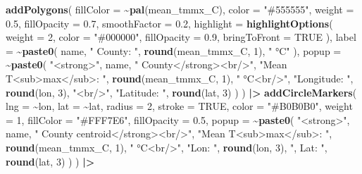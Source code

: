 \documentclass[
]{article}
\newenvironment{Shaded}{\begin{snugshade}}{\end{snugshade}}
\newcommand{\AttributeTok}[1]{\textcolor[rgb]{0.13,0.29,0.53}{#1}}
\newcommand{\ConstantTok}[1]{\textcolor[rgb]{0.56,0.35,0.01}{#1}}
\newcommand{\DecValTok}[1]{\textcolor[rgb]{0.00,0.00,0.81}{#1}}
\newcommand{\FloatTok}[1]{\textcolor[rgb]{0.00,0.00,0.81}{#1}}
\newcommand{\FunctionTok}[1]{\textcolor[rgb]{0.13,0.29,0.53}{\textbf{#1}}}
\newcommand{\NormalTok}[1]{#1}
\newcommand{\SpecialCharTok}[1]{\textcolor[rgb]{0.81,0.36,0.00}{\textbf{#1}}}
\newcommand{\StringTok}[1]{\textcolor[rgb]{0.31,0.60,0.02}{#1}}
\begin{document}
\begin{Shaded}
\begin{Highlighting}[]
  \FunctionTok{addPolygons}\NormalTok{(}
    \AttributeTok{fillColor   =} \SpecialCharTok{\textasciitilde{}}\FunctionTok{pal}\NormalTok{(mean\_tmmx\_C),}
    \AttributeTok{color       =} \StringTok{"\#555555"}\NormalTok{,}
    \AttributeTok{weight      =} \FloatTok{0.5}\NormalTok{,}
    \AttributeTok{fillOpacity =} \FloatTok{0.7}\NormalTok{,}
    \AttributeTok{smoothFactor =} \FloatTok{0.2}\NormalTok{,}
    \AttributeTok{highlight =} \FunctionTok{highlightOptions}\NormalTok{(}
      \AttributeTok{weight      =} \DecValTok{2}\NormalTok{,}
      \AttributeTok{color       =} \StringTok{"\#000000"}\NormalTok{,}
      \AttributeTok{fillOpacity =} \FloatTok{0.9}\NormalTok{,}
      \AttributeTok{bringToFront =} \ConstantTok{TRUE}
\NormalTok{    ),}
    \AttributeTok{label =} \SpecialCharTok{\textasciitilde{}}\FunctionTok{paste0}\NormalTok{(}
\NormalTok{      name, }\StringTok{" County: "}\NormalTok{,}
      \FunctionTok{round}\NormalTok{(mean\_tmmx\_C, }\DecValTok{1}\NormalTok{), }\StringTok{" °C"}
\NormalTok{    ),}
    \AttributeTok{popup =} \SpecialCharTok{\textasciitilde{}}\FunctionTok{paste0}\NormalTok{(}
      \StringTok{"\textless{}strong\textgreater{}"}\NormalTok{, name, }\StringTok{" County\textless{}/strong\textgreater{}\textless{}br/\textgreater{}"}\NormalTok{,}
      \StringTok{"Mean T\textless{}sub\textgreater{}max\textless{}/sub\textgreater{}: "}\NormalTok{, }\FunctionTok{round}\NormalTok{(mean\_tmmx\_C, }\DecValTok{1}\NormalTok{), }\StringTok{" °C\textless{}br/\textgreater{}"}\NormalTok{,}
      \StringTok{"Longitude: "}\NormalTok{, }\FunctionTok{round}\NormalTok{(lon, }\DecValTok{3}\NormalTok{), }\StringTok{"\textless{}br/\textgreater{}"}\NormalTok{,}
      \StringTok{"Latitude: "}\NormalTok{, }\FunctionTok{round}\NormalTok{(lat, }\DecValTok{3}\NormalTok{)}
\NormalTok{    )}
\NormalTok{  ) }\SpecialCharTok{|\textgreater{}}
  \FunctionTok{addCircleMarkers}\NormalTok{(}
    \AttributeTok{lng =} \SpecialCharTok{\textasciitilde{}}\NormalTok{lon,}
    \AttributeTok{lat =} \SpecialCharTok{\textasciitilde{}}\NormalTok{lat,}
    \AttributeTok{radius =} \DecValTok{2}\NormalTok{,}
    \AttributeTok{stroke =} \ConstantTok{TRUE}\NormalTok{,}
    \AttributeTok{color =} \StringTok{"\#B0B0B0"}\NormalTok{,}
    \AttributeTok{weight =} \DecValTok{1}\NormalTok{,}
    \AttributeTok{fillColor =} \StringTok{"\#FFF7E6"}\NormalTok{,}
    \AttributeTok{fillOpacity =} \FloatTok{0.5}\NormalTok{,}
    \AttributeTok{popup =} \SpecialCharTok{\textasciitilde{}}\FunctionTok{paste0}\NormalTok{(}
      \StringTok{"\textless{}strong\textgreater{}"}\NormalTok{, name, }\StringTok{" County centroid\textless{}/strong\textgreater{}\textless{}br/\textgreater{}"}\NormalTok{,}
      \StringTok{"Mean T\textless{}sub\textgreater{}max\textless{}/sub\textgreater{}: "}\NormalTok{, }\FunctionTok{round}\NormalTok{(mean\_tmmx\_C, }\DecValTok{1}\NormalTok{), }\StringTok{" °C\textless{}br/\textgreater{}"}\NormalTok{,}
      \StringTok{"Lon: "}\NormalTok{, }\FunctionTok{round}\NormalTok{(lon, }\DecValTok{3}\NormalTok{), }\StringTok{", Lat: "}\NormalTok{, }\FunctionTok{round}\NormalTok{(lat, }\DecValTok{3}\NormalTok{)}
\NormalTok{    )}
\NormalTok{  ) }\SpecialCharTok{|\textgreater{}}
  

\end{Highlighting}
\end{Shaded}
\end{document}
